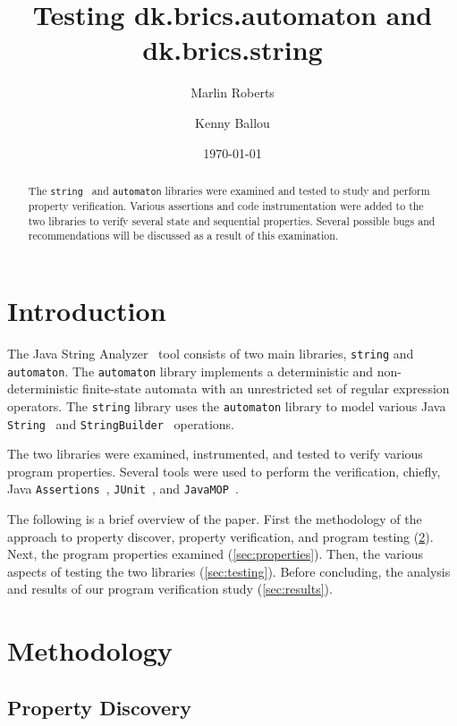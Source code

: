 \documentclass[letterpaper,sigplan]{acmart}
\title{Testing dk.brics.automaton and dk.brics.string}
\date{\today}
\author{Marlin Roberts}
\affiliation{%
  \institution{Boise State University}
}
\author{Kenny Ballou}
\affiliation{%
  \institution{Boise State University}
}
\begin{document}
\begin{abstract}
  The \lstinline{string}~\cite{strings2003} and
  \lstinline{automaton} libraries were examined and tested to study and perform
  property verification.  Various assertions and code instrumentation were
  added to the two libraries to verify several state and sequential properties.
  Several possible bugs and recommendations will be discussed as a result of
  this examination.
\end{abstract}

\maketitle{}

\section{Introduction}

The Java String Analyzer~\cite{strings2003} tool consists of two main
libraries, \lstinline{string} and \lstinline{automaton}.  The
\lstinline{automaton} library implements a deterministic and non-deterministic
finite-state automata with an unrestricted set of regular expression operators.
The \lstinline{string} library uses the \lstinline{automaton} library to model
various Java \lstinline{String}~\cite{oracle-java-string} and
\lstinline{StringBuilder}~\cite{oracle-java-stringbuilder} operations.

The two libraries were examined, instrumented, and tested to verify various
program properties.  Several tools were used to perform the verification,
chiefly, Java \lstinline{Assertions}~\cite{oracle-java-assertions},
\lstinline{JUnit}~\cite{junit4}, and \lstinline{JavaMOP}~\cite{javamop}.

The following is a brief overview of the paper.  First the methodology of the
approach to property discover, property verification, and program
testing (\ref{sec:methodology}).  Next, the program properties
examined (\ref{sec:properties}).  Then, the various aspects of testing the two
libraries (\ref{sec:testing}).  Before concluding, the analysis and results of
our program verification study (\ref{sec:results}).

\section{Methodology}\label{sec:methodology}

\subsection{Property Discovery}
\end{document}
